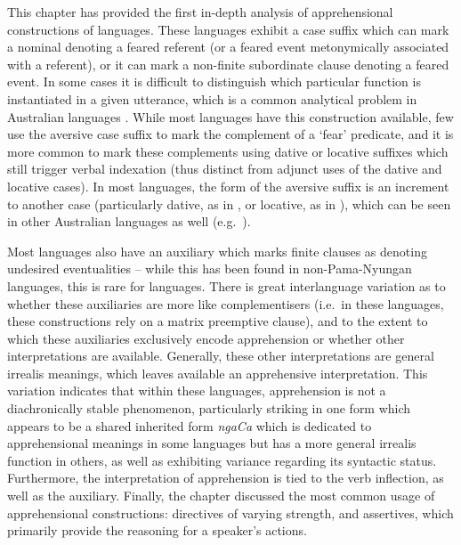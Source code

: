\documentclass[output=paper,colorlinks,citecolor=brown]{langscibook}
\begin{document}
This chapter has provided the first in-depth analysis of apprehensional constructions of  languages. These languages exhibit a case suffix which can mark a nominal denoting a feared referent (or a feared event metonymically associated with a referent), or it can mark a non-finite subordinate clause denoting a feared event. In some cases it is difficult to distinguish which particular function is instantiated in a given utterance, which is a common analytical problem in Australian languages \citep{hale_essential_1982}. While most  languages have this construction available, few use the aversive case suffix to mark the complement of a `fear' predicate, and it is more common to mark these complements using dative or locative suffixes which still trigger verbal indexation (thus distinct from adjunct uses of the dative and locative cases). In most  languages, the form of the aversive suffix is an increment to another case (particularly dative, as in , or locative, as in ), which can be seen in other Australian languages as well (e.g.\  ).

Most  languages also have an auxiliary which marks finite clauses as denoting undesired eventualities -- while this has been found in non-Pama-Nyungan languages, this is rare for  languages. There is great interlanguage variation as to whether these auxiliaries are more like complementisers (i.e.\  in these languages, these constructions rely on a matrix preemptive clause), and to the extent to which these auxiliaries exclusively encode apprehension or whether other interpretations are available. Generally, these other interpretations are general irrealis meanings, which leaves available an apprehensive interpretation. This variation indicates that within these languages, apprehension is not a diachronically stable phenomenon, particularly striking in one form which appears to be a shared inherited form \textit{ngaCa} which is dedicated to apprehensional meanings in some languages but has a more general irrealis function in others, as well as exhibiting variance regarding its syntactic status. Furthermore, the interpretation of apprehension is tied to the verb inflection, as well as the auxiliary. Finally, the chapter discussed the most common usage of apprehensional constructions: directives of varying strength, and assertives, which primarily provide the reasoning for a speaker's actions. 
\end{document}
